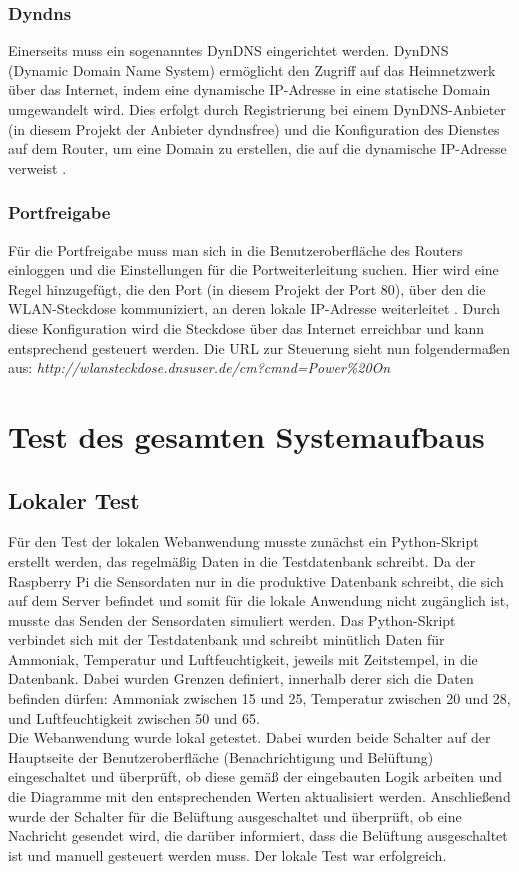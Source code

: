 \documentclass[conference]{IEEEtran}
\begin{document}
\subsubsection{Dyndns}
Einerseits muss ein sogenanntes DynDNS eingerichtet werden. DynDNS (Dynamic Domain Name System) ermöglicht den Zugriff auf das Heimnetzwerk über das Internet, indem eine dynamische IP-Adresse in eine statische Domain umgewandelt wird. Dies erfolgt durch Registrierung bei einem DynDNS-Anbieter (in diesem Projekt der Anbieter dyndnsfree) und die Konfiguration des Dienstes auf dem Router, um eine Domain zu erstellen, die auf die dynamische IP-Adresse verweist \cite{dyndns}.
\subsubsection{Portfreigabe}
Für die Portfreigabe muss man sich in die Benutzeroberfläche des Routers einloggen und die Einstellungen für die Portweiterleitung suchen. Hier wird eine Regel hinzugefügt, die den Port (in diesem Projekt der Port 80), über den die WLAN-Steckdose kommuniziert, an deren lokale IP-Adresse weiterleitet \cite{portfreigabe}. Durch diese Konfiguration wird die Steckdose über das Internet erreichbar und kann entsprechend gesteuert werden. Die URL zur Steuerung sieht nun folgendermaßen aus: \textit{http://wlansteckdose.dnsuser.de/cm?cmnd=Power\%20On}

\section{Test des gesamten Systemaufbaus}
\subsection{Lokaler Test}
Für den Test der lokalen Webanwendung musste zunächst ein Python-Skript erstellt werden, das regelmäßig Daten in die Testdatenbank schreibt. Da der Raspberry Pi die Sensordaten nur in die produktive Datenbank schreibt, die sich auf dem Server befindet und somit für die lokale Anwendung nicht zugänglich ist, musste das Senden der Sensordaten simuliert werden. Das Python-Skript verbindet sich mit der Testdatenbank und schreibt minütlich Daten für Ammoniak, Temperatur und Luftfeuchtigkeit, jeweils mit Zeitstempel, in die Datenbank. Dabei wurden Grenzen definiert, innerhalb derer sich die Daten befinden dürfen: Ammoniak zwischen 15 und 25, Temperatur zwischen 20 und 28, und Luftfeuchtigkeit zwischen 50 und 65. \\
Die Webanwendung wurde lokal getestet. Dabei wurden beide Schalter auf der Hauptseite der Benutzeroberfläche (Benachrichtigung und Belüftung) eingeschaltet und überprüft, ob diese gemäß der eingebauten Logik arbeiten und die Diagramme mit den entsprechenden Werten aktualisiert werden. Anschließend wurde der Schalter für die Belüftung ausgeschaltet und überprüft, ob eine Nachricht gesendet wird, die darüber informiert, dass die Belüftung ausgeschaltet ist und manuell gesteuert werden muss. Der lokale Test war erfolgreich. \\
\end{document}
